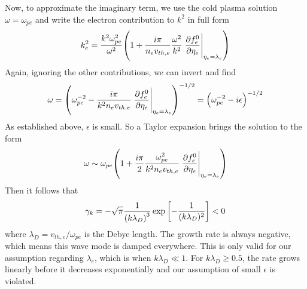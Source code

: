 Now, to approximate the imaginary term, we use the cold plasma solution
$\omega=\omega_{pe}$ and write the electron contribution to $k^2$ in full
form
\begin{equation}
    k_e^2=\frac{k^2\omega_{pe}^2}{\omega^2}
    \qty(1
        +\frac{i\pi}{n_ev_{th,e}}\frac{\omega^2}{k^2}
        \left.\frac{\partial f_e^0}{\partial\eta_e}\right\rvert_{\eta_e=\lambda_e}^{})
\end{equation}
Again, ignoring the other contributions, we can invert and find
\begin{equation}
    \omega=\qty(\omega_{pe}^{-2}
    -\frac{i\pi}{k^2n_ev_{th,e}}
    \left.\frac{\partial f_e^0}{\partial\eta_e}\right\rvert_{\eta_e=\lambda_e}^{}
    )^{-1/2}=\qty(\omega_{pe}^{-2}-i\epsilon)^{-1/2}
\end{equation}
As established above, $\epsilon$ is small. So a Taylor expansion brings the
solution to the form
\begin{equation}
    \omega\sim\omega_{pe}\qty(
        1+\frac{i\pi}{2}\frac{\omega_{pe}^2}{k^2n_ev_{th,e}}
        \left.\frac{\partial f_e^0}{\partial\eta_e}\right\rvert_{\eta_e=\lambda_e}^{}
    )
\end{equation}
Then it follows that
\begin{equation}
    \gamma_k=-\sqrt\pi\frac1{\qty(k\lambda_D)^3}\exp\qty[-\frac1{(k\lambda_D)^2}]<0
\end{equation}
where $\lambda_D=v_{th,e}/\omega_{pe}$ is the Debye length. The growth rate
is always negative, which means this wave mode is damped everywhere. This is
only valid for our assumption regarding $\lambda_e$, which is when
$k\lambda_D\ll1$. For $k\lambda_D\geq0.5$, the rate grows linearly before it
decreases exponentially and our assumption of small $\epsilon$ is violated.


